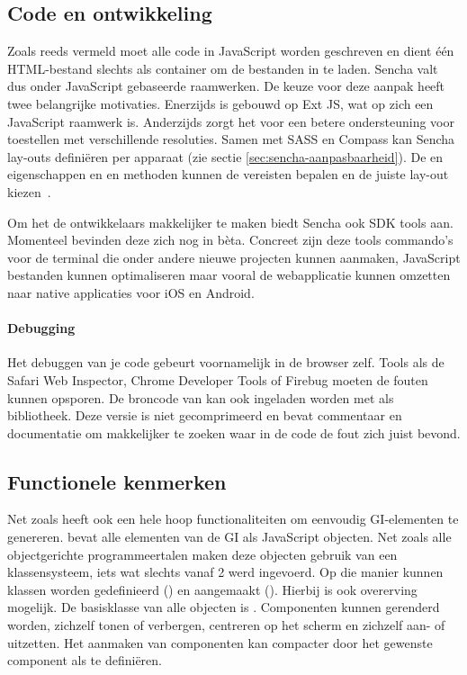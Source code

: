\subsection{Code en ontwikkeling}
Zoals reeds vermeld moet alle code in JavaScript worden geschreven en dient één HTML-bestand slechts als container om de bestanden in te laden.  
Sencha valt dus onder JavaScript gebaseerde raamwerken.  
De keuze voor deze aanpak heeft twee belangrijke motivaties.  
Enerzijds is \st{} gebouwd op Ext JS,  wat op zich een JavaScript raamwerk is.  
Anderzijds zorgt het voor een betere ondersteuning voor toestellen met verschillende resoluties.  
Samen met SASS en Compass kan Sencha lay-outs definiëren per apparaat (zie sectie \ref{sec:sencha-aanpasbaarheid}).  
De  en  eigenschappen en  en  methoden kunnen de vereisten bepalen en de juiste lay-out kiezen~\cite{JohnEClark2012}.

Om het de ontwikkelaars makkelijker te maken biedt Sencha ook SDK tools aan.  
Momenteel bevinden deze zich nog in bèta.  
Concreet zijn deze tools commando's voor de terminal die onder andere nieuwe projecten kunnen aanmaken, JavaScript bestanden kunnen optimaliseren maar vooral de webapplicatie kunnen omzetten naar native applicaties voor iOS en Android.

\paragraph{Debugging}
Het debuggen van je code gebeurt voornamelijk in de browser zelf.  
Tools als de Safari Web Inspector,  Chrome Developer Tools of Firebug moeten de fouten kunnen opsporen.  
De broncode van \st{} kan ook ingeladen worden met  als bibliotheek.  
Deze versie is niet gecomprimeerd en bevat commentaar en documentatie om makkelijker te zoeken waar in de code de fout zich juist bevond.

\subsection{Functionele kenmerken}
Net zoals \jqm{} heeft \st{} ook een hele hoop functionaliteiten om eenvoudig GI-elementen te genereren.  
\st{} bevat alle elementen van de GI als JavaScript objecten.  
Net zoals alle objectgerichte programmeertalen maken deze objecten gebruik van een klassensysteem,  iets wat slechts vanaf \st{} 2 werd ingevoerd.  
Op die manier kunnen klassen worden gedefinieerd () en aangemaakt ().  
Hierbij is ook overerving mogelijk.  
De basisklasse van alle objecten is .  
Componenten kunnen gerenderd worden, zichzelf tonen of verbergen,  centreren op het scherm en zichzelf aan- of uitzetten.   
Het aanmaken van componenten kan compacter door het gewenste component als  te definiëren.  

